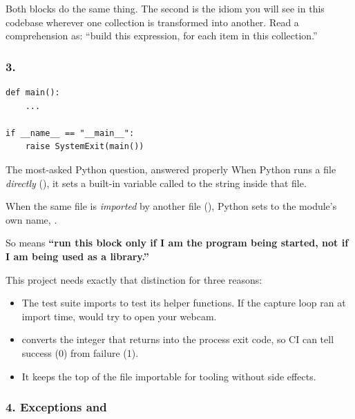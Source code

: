 Both blocks do the same thing. The second is the idiom you will see in this codebase wherever one
collection is transformed into another. Read a comprehension as: ``build this expression, for each
item in this collection.''

\subsubsection*{3. }

\begin{codecard}
\begin{lstlisting}
def main():
    ...

if __name__ == "__main__":
    raise SystemExit(main())
\end{lstlisting}
\end{codecard}

\begin{pythonconcept}{The most-asked Python question, answered properly}
When Python runs a file \emph{directly} (), it sets a built-in
variable called  to the string  inside that file.

When the same file is \emph{imported} by another file (), Python sets
 to the module's own name, .

So  means \textbf{``run this block only if I am the program
being started, not if I am being used as a library.''}

This project needs exactly that distinction for three reasons:

\begin{itemize}
  \item The test suite imports  to test its helper functions. If the capture
        loop ran at import time,  would try to open your webcam.
  \item {} converts the integer that  returns into the
        process exit code, so CI can tell success (0) from failure (1).
  \item It keeps the top of the file importable for tooling without side effects.
\end{itemize}
\end{pythonconcept}

\subsubsection*{4. Exceptions and }

